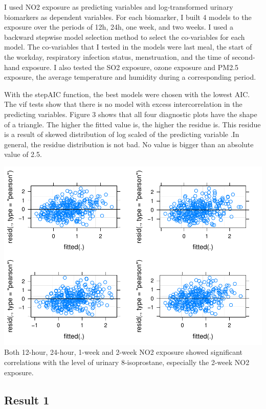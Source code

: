 \documentclass[12pt,]{article}
\begin{document}
I used NO2 exposure as predicting variables and log-transformed urinary
biomarkers as dependent variables. For each biomarker, I built 4 models
to the exposure over the periods of 12h, 24h, one week, and two weeks. I
used a backward stepwise model selection method to select the
co-variables for each model. The co-variables that I tested in the
models were last meal, the start of the workday, respiratory infection
status, menstruation, and the time of second-hand exposure. I also
tested the SO2 exposure, ozone exposure and PM2.5 exposure, the average
temperature and humidity during a corresponding period.

With the stepAIC function, the best models were chosen with the lowest
AIC. The vif tests show that there is no model with excess
intercorrelation in the predicting variables. Figure 3 shows that all
four diagnostic plots have the shape of a triangle. The higher the
fitted value is, the higher the residue is. This residue is a result of
skewed distribution of log scaled of the predicting variable .In
general, the residue distribution is not bad. No value is bigger than an
absolute value of 2.5.

\includegraphics{Wang_ENV872_Project_files/figure-latex/unnamed-chunk-9-1.pdf}
Both 12-hour, 24-hour, 1-week and 2-week NO2 exposure showed significant
correlations with the level of urinary 8-isoprostane, especially the
2-week NO2 exposure.

\hypertarget{result-1}{%
\subsection{Result 1}\label{result-1}}
\end{document}
